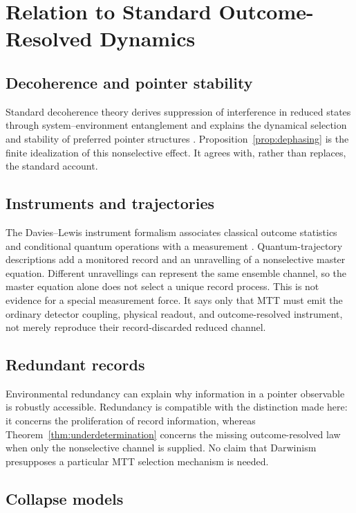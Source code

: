 \documentclass[11pt]{article}
\begin{document}
\section{Relation to Standard Outcome-Resolved Dynamics}

\subsection{Decoherence and pointer stability}

Standard decoherence theory derives suppression of interference in reduced
states through system--environment entanglement and explains the dynamical
selection and stability of preferred pointer structures
\cite{Zurek2003,Schlosshauer2005}.  Proposition~\ref{prop:dephasing} is the
finite idealization of this nonselective effect.  It agrees with, rather than
replaces, the standard account.

\subsection{Instruments and trajectories}

The Davies--Lewis instrument formalism associates classical outcome
statistics and conditional quantum operations with a measurement
\cite{DaviesLewis1970}.  Quantum-trajectory descriptions add a monitored
record and an unravelling of a nonselective master equation.  Different
unravellings can represent the same ensemble channel, so the master equation
alone does not select a unique record process.  This is not evidence for a
special measurement force.  It says only that MTT must emit the ordinary
detector coupling, physical readout, and outcome-resolved instrument, not
merely reproduce their record-discarded reduced channel.

\subsection{Redundant records}

Environmental redundancy can explain why information in a pointer observable
is robustly accessible.  Redundancy is compatible with the distinction made
here: it concerns the proliferation of record information, whereas
Theorem~\ref{thm:underdetermination} concerns the missing outcome-resolved law
when only the nonselective channel is supplied.  No claim that Darwinism
presupposes a particular MTT selection mechanism is needed.

\subsection{Collapse models}
\end{document}
